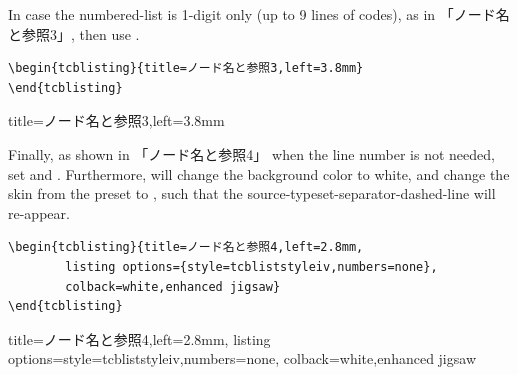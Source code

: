 \documentclass[../geometrymemo.tex]{subfiles}
\begin{document}
In case the numbered-list is 1-digit only (up to 9 lines of codes), as in 「ノード名と参照3」, then use .
\begin{tcolorbox}
    \begin{verbatim}
\begin{tcblisting}{title=ノード名と参照3,left=3.8mm}
\end{tcblisting}
\end{verbatim}
\end{tcolorbox}
\begin{tcblisting}{title=ノード名と参照3,left=3.8mm}
\end{tcblisting}

Finally, as shown in 「ノード名と参照4」 when the line number is not needed, set  and . Furthermore,  will change the background color to white, and change the skin from the preset  to , such that the source-typeset-separator-dashed-line will re-appear.
\begin{tcolorbox}
    \begin{verbatim}
\begin{tcblisting}{title=ノード名と参照4,left=2.8mm,
        listing options={style=tcbliststyleiv,numbers=none},
        colback=white,enhanced jigsaw}
\end{tcblisting}
\end{verbatim}
\end{tcolorbox}
\begin{tcblisting}{title=ノード名と参照4,left=2.8mm,
        listing options={style=tcbliststyleiv,numbers=none},
        colback=white,enhanced jigsaw}
\end{tcblisting}
\end{document}
